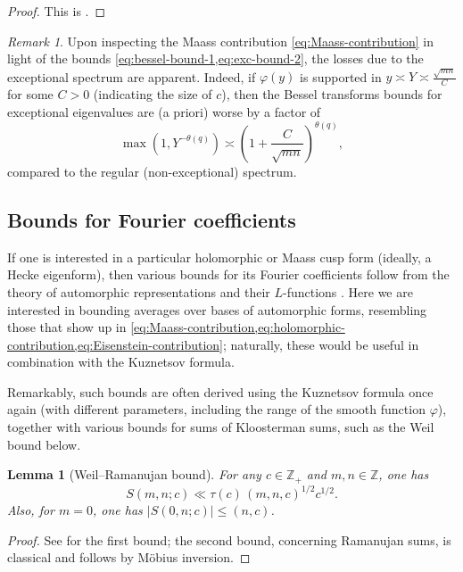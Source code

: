 \documentclass[reqno,11pt]{amsart}
\newtheorem{knownlemma}[knowntheorem]{Lemma}
\theoremstyle{remark}
\newtheorem*{remark}{Remark}
\numberwithin{equation}{section}
\newcommand{\Z}{\mathbb{Z}}
\begin{document}
\begin{proof}
This is \cite[Theorem 2]{deshouillers1982kloosterman}.
\end{proof}

\begin{remark}
    Upon inspecting the Maass contribution \cref{eq:Maass-contribution} in light of the bounds \cref{eq:bessel-bound-1,eq:exc-bound-2}, the losses due to the exceptional spectrum are apparent. Indeed, if $\varphi(y)$ is supported in $y \asymp Y \asymp \frac{\sqrt{mn}}{C}$ for some $C > 0$ (indicating the size of $c$), then the Bessel transforms bounds for exceptional eigenvalues are (a priori) worse by a factor of 
    \[
        \max\left(1, Y^{-\theta(q)}\right) \asymp \left(1 + \frac{C}{\sqrt{mn}}\right)^{\theta(q)},
    \]
    compared to the regular (non-exceptional) spectrum.
\end{remark}



\subsection{Bounds for Fourier coefficients} \label{subsec:automorphic-fourier-bounds}
If one is interested in a particular holomorphic or Maass cusp form (ideally, a Hecke eigenform), then various bounds for its Fourier coefficients follow from the theory of automorphic representations and their $L$-functions \cite{deshouillers1982kloosterman,sarnak1995selberg,kim2003functoriality,bump1998automorphic,goldfeld2011automorphic}. Here we are interested in bounding averages over bases of automorphic forms, resembling those that show up in \cref{eq:Maass-contribution,eq:holomorphic-contribution,eq:Eisenstein-contribution}; naturally, these would be useful in combination with the Kuznetsov formula.

Remarkably, such bounds are often derived using the Kuznetsov formula once again (with different parameters, including the range of the smooth function $\varphi$), together with various bounds for sums of Kloosterman sums, such as the Weil bound below. 

\begin{knownlemma}[Weil--Ramanujan bound] \label{lem:weil}
For any $c \in \Z_+$ and $m, n \in \Z$, one has
\[
    S(m, n; c) \ll \tau(c)\, (m, n, c)^{1/2} c^{1/2}.
\]
Also, for $m = 0$, one has $|S(0, n; c)| \le (n, c)$.
\end{knownlemma}

\begin{proof}
See \cite[Corollary 11.12]{iwaniec2021analytic} for the first bound; the second bound, concerning Ramanujan sums, is classical and follows by M\"obius inversion.
\end{proof}
\end{document}
